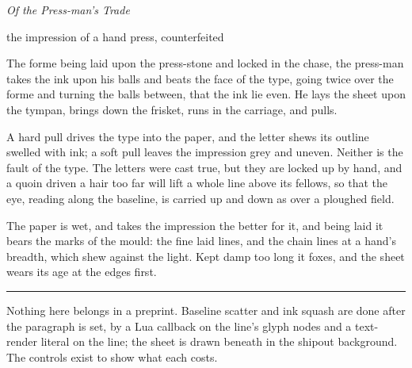 \documentclass[11pt]{article}
\begin{document}
\begin{center}
  {\small{}}\par
  \vspace{0.3em}
  {\Large\itshape Of the Press-man's Trade}\par
  \vspace{0.3em}
  {\footnotesize the impression of a hand press, counterfeited}
\end{center}

\vspace{0.8em}

The forme being laid upon the press-stone and locked in the chase, the
press-man takes the ink upon his balls and beats the face of the type,
going twice over the forme and turning the balls between, that the ink
lie even. He lays the sheet upon the tympan, brings down the frisket,
runs in the carriage, and pulls.

A hard pull drives the type into the paper, and the letter shews its
outline swelled with ink; a soft pull leaves the impression grey and
uneven. Neither is the fault of the type. The letters were cast true, but
they are locked up by hand, and a quoin driven a hair too far will lift a
whole line above its fellows, so that the eye, reading along the
baseline, is carried up and down as over a ploughed field.

The paper is wet, and takes the impression the better for it, and being
laid it bears the marks of the mould: the fine laid lines, and the chain
lines at a hand's breadth, which shew against the light. Kept damp too
long it foxes, and the sheet wears its age at the edges first.

\vspace{1em}
\begin{center}
  \rule{0.3\linewidth}{0.45pt}
\end{center}

\footnotesize\noindent
Nothing here belongs in a preprint. Baseline scatter and ink squash are
done after the paragraph is set, by a Lua callback on the line's glyph
nodes and a text-render literal on the line; the sheet is drawn beneath in
the shipout background. The controls exist to show what each costs.

\medskip\noindent\itshape\atlasstamp
\end{document}
